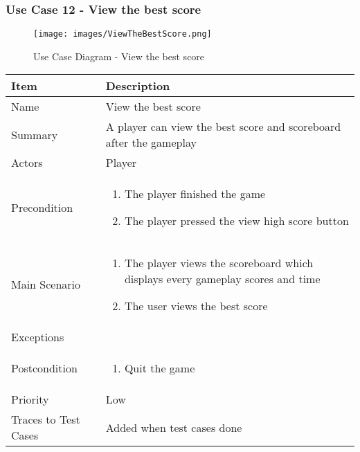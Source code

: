 \documentclass[12pt]{article}
\begin{document}
\newpage


\subsubsection{Use Case 12 - View the best score} \label{uc:12}

\begin{figure}[htbp]
    \centering
    \texttt{[image: images/ViewTheBestScore.png]}
    \caption{Use Case Diagram - View the best score}
    \label{fig:ViewTheBestScore}
\end{figure}

\begin{center}
\setlength{\tabcolsep}{18pt}
\renewcommand{\arraystretch}{1.3}
\begin{tabular}{ |p{3cm}|p{10cm}| }
    \hline
    \rowcolor{green}
   Item & Description \\
    \hline
    Name & View the best score \\
    \hline
    Summary & A player can view the best score and scoreboard after the gameplay \\
    \hline
    Actors & Player \\
    \hline
    Precondition & 
    \vspace*{-0.2in}
    \begin{enumerate}
        \item The player finished the game
        \item The player pressed the view high score button
    \end{enumerate}  \\
    \hline
    Main Scenario &     
    \vspace*{-0.2in}
    \begin{enumerate}
        \item The player views the scoreboard which displays every gameplay scores and time
        \item The user views the best score
    \end{enumerate}  \\
    \hline
    Exceptions & \\
    \hline
    Postcondition &
    \vspace*{-0.2in}
    \begin{enumerate}
        \item Quit the game
    \end{enumerate}  \\
    \hline
    Priority & Low \\
    \hline
    Traces to Test Cases & Added when test cases done  \\
    \hline
\end{tabular}
\end{center}
\end{document}
